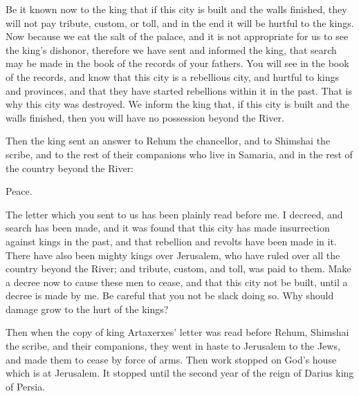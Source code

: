{Be it known now to the king that if this city is built and the walls finished, they will not pay tribute, custom, or toll, and in the end it will be hurtful to the kings.
Now because we eat the salt of the palace, and it is not appropriate for us to see the king’s dishonor, therefore we have sent and informed the king,
that search may be made in the book of the records of your fathers. You will see in the book of the records, and know that this city is a rebellious city, and hurtful to kings and provinces, and that they have started rebellions within it in the past. That is why this city was destroyed.
We inform the king that, if this city is built and the walls finished, then you will have no possession beyond the River.
\par }{\BB \par }{\PP {}Then the king sent an answer to Rehum the chancellor, and to Shimshai the scribe, and to the rest of their companions who live in Samaria, and in the rest of the country beyond the River:
\par }{\BB \par }{\MI Peace.
\par }{\BB \par }{\PI {}The letter which you sent to us has been plainly read before me.
I decreed, and search has been made, and it was found that this city has made insurrection against kings in the past, and that rebellion and revolts have been made in it.
There have also been mighty kings over Jerusalem, who have ruled over all the country beyond the River; and tribute, custom, and toll, was paid to them.
Make a decree now to cause these men to cease, and that this city not be built, until a decree is made by me.
Be careful that you not be slack doing so. Why should damage grow to the hurt of the kings?
\par }{\BB \par }{\PP {}Then when the copy of king Artaxerxes’ letter was read before Rehum, Shimshai the scribe, and their companions, they went in haste to Jerusalem to the Jews, and made them to cease by force of arms.
Then work stopped on God’s house which is at Jerusalem. It stopped until the second year of the reign of Darius king of Persia.

}
